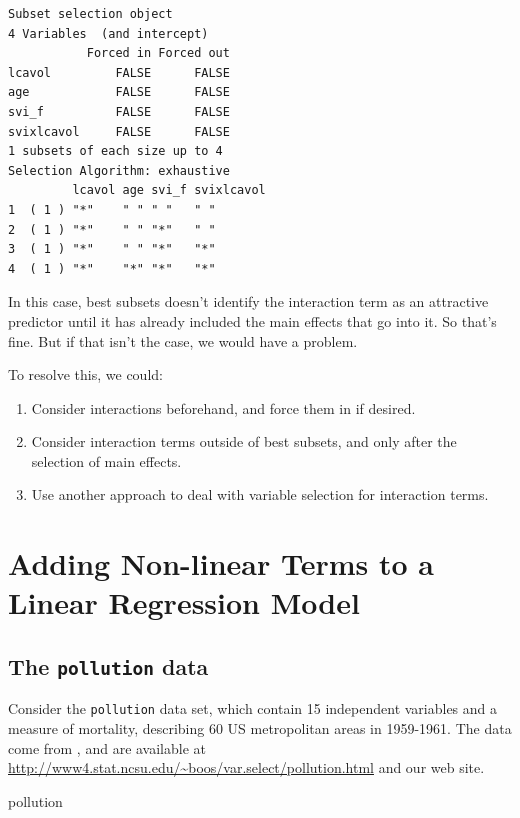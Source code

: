 \documentclass[]{book}
\newenvironment{Shaded}{\begin{snugshade}}{\end{snugshade}}
\newcommand{\NormalTok}[1]{#1}
\providecommand{\tightlist}{%
  \setlength{\itemsep}{0pt}\setlength{\parskip}{0pt}}
\theoremstyle{definition}
\theoremstyle{definition}
\theoremstyle{definition}
\theoremstyle{remark}
\begin{document}
\begin{verbatim}
Subset selection object
4 Variables  (and intercept)
           Forced in Forced out
lcavol         FALSE      FALSE
age            FALSE      FALSE
svi_f          FALSE      FALSE
svixlcavol     FALSE      FALSE
1 subsets of each size up to 4
Selection Algorithm: exhaustive
         lcavol age svi_f svixlcavol
1  ( 1 ) "*"    " " " "   " "       
2  ( 1 ) "*"    " " "*"   " "       
3  ( 1 ) "*"    " " "*"   "*"       
4  ( 1 ) "*"    "*" "*"   "*"       
\end{verbatim}

In this case, best subsets doesn't identify the interaction term as an
attractive predictor until it has already included the main effects that
go into it. So that's fine. But if that isn't the case, we would have a
problem.

To resolve this, we could:

\begin{enumerate}
\def\labelenumi{\arabic{enumi}.}
\tightlist
\item
  Consider interactions beforehand, and force them in if desired.
\item
  Consider interaction terms outside of best subsets, and only after the
  selection of main effects.
\item
  Use another approach to deal with variable selection for interaction
  terms.
\end{enumerate}

\chapter{Adding Non-linear Terms to a Linear Regression
Model}\label{adding-non-linear-terms-to-a-linear-regression-model}

\section{\texorpdfstring{The \texttt{pollution}
data}{The pollution data}}\label{the-pollution-data}

Consider the \texttt{pollution} data set, which contain 15 independent
variables and a measure of mortality, describing 60 US metropolitan
areas in 1959-1961. The data come from \citet{McDonald1973}, and are
available at
\url{http://www4.stat.ncsu.edu/~boos/var.select/pollution.html} and our
web site.

\begin{Shaded}
\begin{Highlighting}[]
\NormalTok{pollution}
\end{Highlighting}
\end{Shaded}
\end{document}
